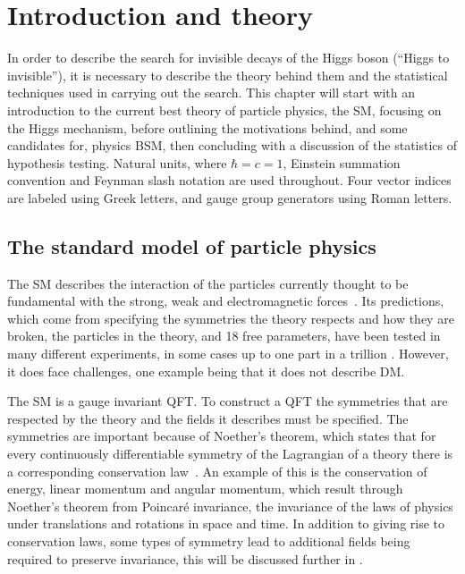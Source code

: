 \chapter{Introduction and theory}
\label{chap:theory}
In order to describe the search for invisible decays of the Higgs boson (``Higgs to invisible''), it is necessary to describe the theory behind them and the statistical techniques used in carrying out the search. This chapter will start with an introduction to the current best theory of particle physics, the \ac{SM}, focusing on the Higgs mechanism, before outlining the motivations behind, and some candidates for, physics \ac{BSM}, then concluding with a discussion of the statistics of hypothesis testing. Natural units, where $\hbar=c=1$, Einstein summation convention and Feynman slash notation are used throughout. Four vector indices are labeled using Greek letters, and gauge group generators using Roman letters.


\section{The standard model of particle physics}
\label{sec:SM}
The SM describes the interaction of the particles currently thought to be fundamental with the strong, weak and electromagnetic forces~\cite{GlashowPartialSymmetries,WeinbergModelOfLeptons,SalamNobelSymposium,eightfoldway}. Its predictions, which come from specifying the symmetries the theory respects and how they are broken, the particles in the theory, and 18 free parameters, have been tested in many different experiments, in some cases up to one part in a trillion \cite{PhysRevLett.100.120801}. However, it does face challenges, one example being that it does not describe \ac{DM}. 

The SM is a gauge invariant \ac{QFT}. To construct a QFT the symmetries that are respected by the theory and the fields it describes must be specified. The symmetries are important because of Noether's theorem, which states that for every continuously differentiable symmetry of the Lagrangian of a theory there is a corresponding conservation law~\cite{Noether:1918zz,doi:10.1080/00411457108231446}. An example of this is the conservation of energy, linear momentum and angular momentum, which result through Noether's theorem from Poincar\'e invariance, the invariance of the laws of physics under translations and rotations in space and time. In addition to giving rise to conservation laws, some types of symmetry lead to additional fields being required to preserve invariance, this will be discussed further in  \cite{PhysRev.96.191}.


